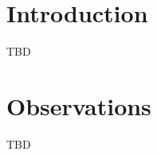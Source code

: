 \documentclass[12,manuscript,usenatbib]{aastex}
\begin{document}

\section{Introduction}

TBD

\section{Observations}


TBD
\end{document}
